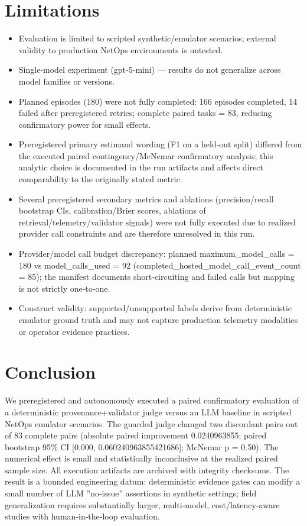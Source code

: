 \documentclass[conference]{IEEEtran}
\begin{document}
\section{Limitations}
\begin{itemize}
\item Evaluation is limited to scripted synthetic/emulator scenarios; external validity to production NetOps environments is untested.
\item Single‑model experiment (gpt-5-mini) --- results do not generalize across model families or versions.
\item Planned episodes (180) were not fully completed: 166 episodes completed, 14 failed after preregistered retries; complete paired tasks = 83, reducing confirmatory power for small effects.
\item Preregistered primary estimand wording (F1 on a held‑out split) differed from the executed paired contingency/McNemar confirmatory analysis; this analytic choice is documented in the run artifacts and affects direct comparability to the originally stated metric.
\item Several preregistered secondary metrics and ablations (precision/recall bootstrap CIs, calibration/Brier scores, ablations of retrieval/telemetry/validator signals) were not fully executed due to realized provider call constraints and are therefore unresolved in this run.
\item Provider/model call budget discrepancy: planned maximum\_model\_calls = 180 vs model\_calls\_used = 92 (completed\_hosted\_model\_call\_event\_count = 85); the manifest documents short‑circuiting and failed calls but mapping is not strictly one‑to‑one.
\item Construct validity: supported/unsupported labels derive from deterministic emulator ground truth and may not capture production telemetry modalities or operator evidence practices.
\end{itemize}

\section{Conclusion}
We preregistered and autonomously executed a paired confirmatory evaluation of a deterministic provenance+validator judge versus an LLM baseline in scripted NetOps emulator scenarios. The guarded judge changed two discordant pairs out of 83 complete pairs (absolute paired improvement 0.0240963855; paired bootstrap 95\% CI [0.000, 0.060240963855421686]; McNemar p = 0.50). The numerical effect is small and statistically inconclusive at the realized paired sample size. All execution artifacts are archived with integrity checksums. The result is a bounded engineering datum: deterministic evidence gates can modify a small number of LLM ''no‑issue'' assertions in synthetic settings; field generalization requires substantially larger, multi‑model, cost/latency‑aware studies with human‑in‑the‑loop evaluation.
\end{document}
